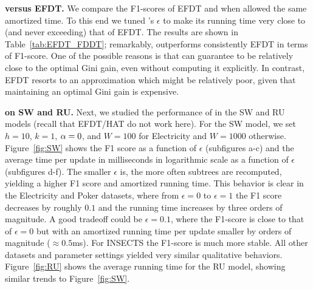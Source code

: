 \noindent \textbf{\algo{} versus EFDT.} We compare the F1-scores of EFDT and \algo{} when allowed the same amortized time. To this end we tuned \algo{}'s $\epsilon$ to make its running time very close to (and never exceeding) that of EFDT. The results are shown in Table~\ref{tab:EFDT_FDDT}; remarkably, \algo{} outperforms consistently EFDT in terms of F1-score. One of the possible reasons is that \algo{} can guarantee to be relatively close to the optimal Gini gain, even without computing it explicitly. In contrast, EFDT resorts to an approximation which might be relatively poor, given that maintaining an optimal Gini gain is expensive. 

\noindent \textbf{\algo{} on SW and RU.} Next, we studied the performance of \algo{} in the SW and RU models (recall that EFDT/HAT do not work here). For the SW model, we set $h=10$, $k=1$, $\alpha=0$, and $W=100$ for Electricity and $W=1000$ otherwise. Figure~\ref{fig:SW} shows the F1 score as a function of $\epsilon$ (subfigures a-c) and the average time per update in milliseconds in logarithmic scale as a function of $\epsilon$ (subfigures d-f). The smaller $\epsilon$ is, the more often subtrees are recomputed, yielding a higher F1 score and amortized running time. This behavior is clear in the Electricity and Poker datasets, where from $\epsilon=0$ to $\epsilon=1$ the F1 score decreases by roughly $0.1$ and the running time increases by three orders of magnitude. A good tradeoff could be $\epsilon=0.1$, where the F1-score is close to that of $\epsilon=0$ but with an amortized running time per update smaller by orders of magnitude ($\approx 0.5$ms). For INSECTS the F1-score is much more stable. All other datasets and parameter settings yielded very similar qualitative behaviors. Figure~\ref{fig:RU} shows the average running time for the RU model, showing similar trends to Figure~\ref{fig:SW}. %

